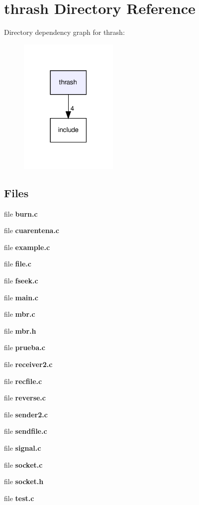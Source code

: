 \section{thrash Directory Reference}
\label{dir_c379293c836f304268e92f9c3073abed}
Directory dependency graph for thrash\+:\nopagebreak
\begin{figure}[H]
\begin{center}
\leavevmode
\includegraphics[width=134pt]{dir_c379293c836f304268e92f9c3073abed_dep}
\end{center}
\end{figure}
\subsection*{Files}
\begin{DoxyCompactItemize}
\item 
file \textbf{ burn.\+c}
\item 
file \textbf{ cuarentena.\+c}
\item 
file \textbf{ example.\+c}
\item 
file \textbf{ file.\+c}
\item 
file \textbf{ fseek.\+c}
\item 
file \textbf{ main.\+c}
\item 
file \textbf{ mbr.\+c}
\item 
file \textbf{ mbr.\+h}
\item 
file \textbf{ prueba.\+c}
\item 
file \textbf{ receiver2.\+c}
\item 
file \textbf{ recfile.\+c}
\item 
file \textbf{ reverse.\+c}
\item 
file \textbf{ sender2.\+c}
\item 
file \textbf{ sendfile.\+c}
\item 
file \textbf{ signal.\+c}
\item 
file \textbf{ socket.\+c}
\item 
file \textbf{ socket.\+h}
\item 
file \textbf{ test.\+c}
\end{DoxyCompactItemize}

